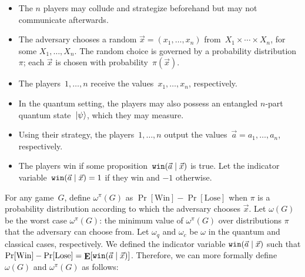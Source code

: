 







\begin{itemize}
\item{The $n$ players may collude and strategize beforehand but may not communicate afterwards.}
\item{The adversary chooses a random $\vec{x}=(x_1, \ldots, x_n)$ from~$X_1 \times \cdots \times X_n$, for some $X_1, \ldots, X_n$. The random choice is governed by a probability distribution~$\pi$; each $\vec{x}$ is chosen with probability~$\pi(\vec{x})$.}
\item{The players~$1, \ldots, n$ receive the values~$x_1, \ldots, x_n$, respectively.}
\item{In the quantum setting, the players may also possess an entangled $n$-part quantum state~$\ket{\psi}$, which they may measure.}
\item{Using their strategy, the players~$1, \ldots, n$ output the values~$\vec{a} = a_1, \ldots, a_n$, respectively.}
\item{The players win if some proposition~$\texttt{win}(\vec{a} \nobreak\mid\nobreak \vec{x})$ is true. Let the indicator variable~$\texttt{win}(\vec{a} \nobreak\mid\nobreak \vec{x}) = 1$ if they win and $-1$ otherwise.}
\end{itemize}

For any game~$G$, define $\omega^\pi(G)$ as $\Pr[\textrm{Win}] - \Pr[\textrm{Lose}]$ when $\pi$ is a probability distribution according to which the adversary chooses $\vec{x}$. Let $\omega(G)$ be the worst case $\omega^\pi(G)$: the minimum value of $\omega^\pi(G)$ over distributions $\pi$ that the adversary can choose from. Let $\omega_q$ and $\omega_c$ be $\omega$ in the quantum and classical cases, respectively. We defined the indicator variable $\texttt{win}(\vec{a}\nobreak\mid\nobreak\vec{x})$ such that $\Pr[\textrm{Win}] - \Pr[\textrm{Lose}] = \mathop{\mathbf{E}}[ \texttt{win}(\vec{a}\nobreak\mid\nobreak\vec{x}) ]$. Therefore, we can more formally define $\omega(G)$ and $\omega^\pi(G)$ as follows:


